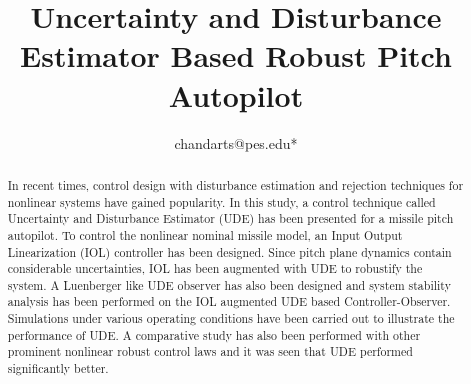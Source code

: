 \documentclass[conference]{IEEEtran}
\title{Uncertainty and Disturbance Estimator Based Robust Pitch Autopilot}
\begin{document}

\author{
	 chandarts@pes.edu*
}


%
%
%
%
%
%
%
%
%
%

\maketitle
\thispagestyle{title}

\begin{abstract}
	In recent times, control design with disturbance estimation and rejection techniques for nonlinear systems have gained popularity. In this study, a control technique called Uncertainty and Disturbance Estimator (UDE) has been presented for a missile pitch autopilot. To control the nonlinear nominal missile model, an Input Output Linearization (IOL) controller has been designed. Since pitch plane dynamics contain considerable uncertainties, IOL has been augmented with UDE to robustify the system. A Luenberger like UDE observer has also been designed and system stability analysis has been performed on the IOL augmented UDE based Controller-Observer. Simulations under various operating conditions have been carried out to illustrate the performance of UDE. A comparative study has also been performed with other prominent nonlinear robust control laws and it was seen that UDE performed significantly better.
	 
\end{abstract}
\end{document}
